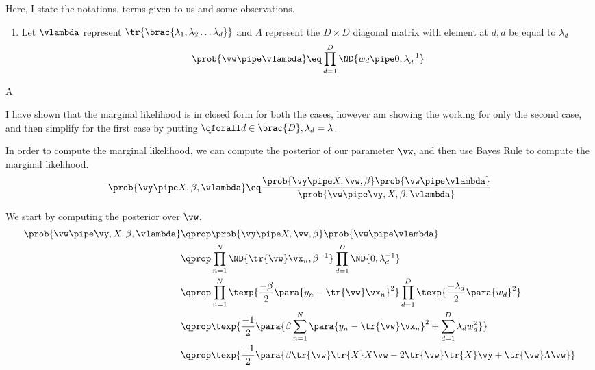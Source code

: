 \documentclass{article}
\begin{document}
\makeheader

\begin{question}

	Here, I state the notations, terms given to us and some observations.

	\begin{enumerate}[label=\bt{\theenumi.}]
			\ditem[Likelihood]
			\begin{align*}
				\prob{\vy \pipe X, \vw, \beta}	\eq	\prod_{n = 1}^N \ND{y_n \pipe \tr{\vw} \vx_n, \beta^{-1}}
			\end{align*}
		\item Let $\vlambda$ represent $\tr{\brac{\lambda_1, \lambda_2 \dots \lambda_d}}$ and $\Lambda$ represent the $D \times D$ diagonal matrix with element at $d, d$ be equal to $\lambda_d$
			\ditem[Prior]
			\begin{align*}
				\prob{\vw \pipe \vlambda}	\eq	\prod_{d = 1}^D \ND{w_d \pipe 0, \lambda_d^{-1}}
			\end{align*}
	\end{enumerate}

	\begin{qpart}{A}

		I have shown that the marginal likelihood is in closed form for both the cases, however am showing the working for only the second case, and then simplify for the first case by putting $\qforall d \in \brac{D}, \lambda_d = \lambda$.

		In order to compute the marginal likelihood, we can compute the posterior of our parameter \ie $\vw$, and then use Bayes Rule to compute the marginal likelihood.
		\begin{equation}
			\prob{\vy \pipe X, \beta, \vlambda}	\eq	\frac{\prob{\vy \pipe X, \vw, \beta} \prob{\vw \pipe \vlambda}}{\prob{\vw \pipe \vy, X, \beta, \vlambda}}
			\label{eq:q1-bayes}
		\end{equation}

		We start by computing the posterior over $\vw$.
		\begin{align*}
			\prob{\vw \pipe \vy, X, \beta, \vlambda}	&\qprop	\prob{\vy \pipe X, \vw, \beta} \prob{\vw \pipe \vlambda} \\
			&\qprop	\prod_{n = 1}^N \ND{\tr{\vw} \vx_n, \beta^{-1}} \prod_{d = 1}^D \ND{0, \lambda_d^{-1}} \\
			&\qprop \prod_{n = 1}^N \texp{\frac{-\beta}{2} \para{y_n - \tr{\vw} \vx_n}^2} \prod_{d = 1}^D \texp{\frac{-\lambda_d}{2} \para{w_d}^2} \\
			&\qprop \texp{\frac{-1}{2} \para{ \beta \sum_{n = 1}^N \para{y_n - \tr{\vw} \vx_n}^2 + \sum_{d = 1}^D \lambda_d w_d^2}} \\
			&\qprop	\texp{\frac{-1}{2} \para{\beta \tr{\vw} \tr{X} X \vw - 2 \tr{\vw} \tr{X} \vy + \tr{\vw} \Lambda \vw}}
		\end{align*}


\end{qpart}
\end{question}
\end{document}
